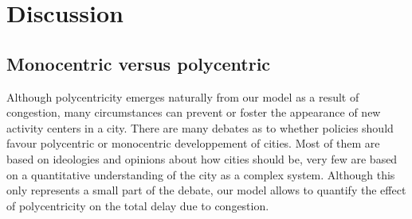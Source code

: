 \section{Discussion}

\subsection{Monocentric versus polycentric}

Although polycentricity emerges naturally from our model as a result of congestion, many circumstances can prevent or foster the appearance of new activity centers in a city. There are many debates as to whether policies should favour polycentric or monocentric developpement of cities. Most of them are based on ideologies and opinions about how cities should be, very few are based on a quantitative understanding of the city as a complex system. Although this only represents a small part of the debate, our model allows to quantify the effect of polycentricity on the total delay due to congestion.

